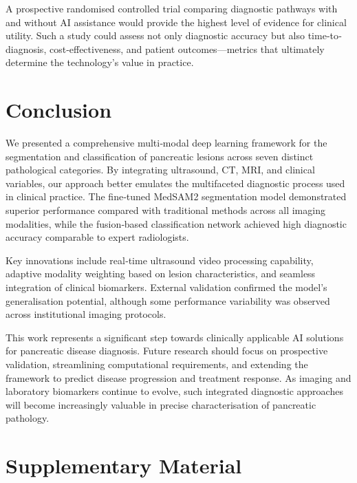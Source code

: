 \documentclass[a4paper, fleqn]{cas-dc}
\begin{document}
    A prospective randomised controlled trial comparing diagnostic pathways with
    and without AI assistance would provide the highest level of evidence for
    clinical utility. Such a study could assess not only diagnostic accuracy but
    also time‐to‐diagnosis, cost‐effectiveness, and patient outcomes—metrics that
    ultimately determine the technology's value in practice.

    \section{Conclusion}
    \label{sec:conclusion}

    We presented a comprehensive multi‐modal deep learning framework for the
    segmentation and classification of pancreatic lesions across seven distinct
    pathological categories. By integrating ultrasound, CT, MRI, and clinical
    variables, our approach better emulates the multifaceted diagnostic process used
    in clinical practice. The fine‐tuned MedSAM2 segmentation model demonstrated
    superior performance compared with traditional methods across all imaging
    modalities, while the fusion‐based classification network achieved high diagnostic
    accuracy comparable to expert radiologists.

    Key innovations include real‐time ultrasound video processing capability,
    adaptive modality weighting based on lesion characteristics, and seamless integration
    of clinical biomarkers. External validation confirmed the model's
    generalisation potential, although some performance variability was observed
    across institutional imaging protocols.

    This work represents a significant step towards clinically applicable AI solutions
    for pancreatic disease diagnosis. Future research should focus on
    prospective validation, streamlining computational requirements, and
    extending the framework to predict disease progression and treatment
    response. As imaging and laboratory biomarkers continue to evolve, such
    integrated diagnostic approaches will become increasingly valuable in
    precise characterisation of pancreatic pathology.

    \appendix
    \section{Supplementary Material}
    \label{appendix:suppl}
\end{document}
